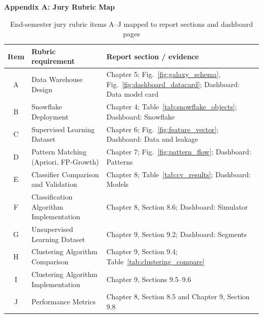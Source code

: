 \documentclass[12pt, a4paper]{report}
\begin{document}
\clearpage
{}
{}
\begin{center}
    {\huge \textbf{Appendix A: Jury Rubric Map}}\\[1cm]
\end{center}

\begin{table}[H]
    \centering
    \small
    \renewcommand{\arraystretch}{1.3}
    \begin{tabularx}{\textwidth}{|c|>{\raggedright\arraybackslash}X|>{\raggedright\arraybackslash}X|}
        \hline
        \textbf{Item} & \textbf{Rubric requirement} & \textbf{Report section / evidence} \\
        \hline
        A & Data Warehouse Design & Chapter 5; Fig.~\ref{fig:galaxy_schema}, Fig.~\ref{fig:dashboard_datacard}; Dashboard: Data model card \\
        \hline
        B & Snowflake Deployment & Chapter 4; Table~\ref{tab:snowflake_objects}; Dashboard: Snowflake \\
        \hline
        C & Supervised Learning Dataset & Chapter 6; Fig.~\ref{fig:feature_vector}; Dashboard: Data and leakage \\
        \hline
        D & Pattern Matching (Apriori, FP-Growth) & Chapter 7; Fig.~\ref{fig:pattern_flow}; Dashboard: Patterns \\
        \hline
        E & Classifier Comparison and Validation & Chapter 8; Table~\ref{tab:cv_results}; Dashboard: Models \\
        \hline
        F & Classification Algorithm Implementation & Chapter 8, Section 8.6; Dashboard: Simulator \\
        \hline
        G & Unsupervised Learning Dataset & Chapter 9, Section 9.2; Dashboard: Segments \\
        \hline
        H & Clustering Algorithm Comparison & Chapter 9, Section 9.4; Table~\ref{tab:clustering_compare} \\
        \hline
        I & Clustering Algorithm Implementation & Chapter 9, Sections 9.5--9.6 \\
        \hline
        J & Performance Metrics & Chapter 8, Section 8.5 and Chapter 9, Section 9.8 \\
        \hline
    \end{tabularx}
    \caption{End-semester jury rubric items A--J mapped to report sections and dashboard pages}
    \label{tab:jury_map}
\end{table}
\end{document}
